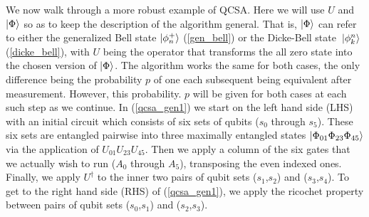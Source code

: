 \documentclass[10pt]{article}
\begin{document}
We now walk through a more robust example of QCSA. Here we will use $U$ and $\ket{\Phi}$ so as to keep the description of the algorithm general. That is, $\ket{\Phi}$ can refer to either the generalized Bell state $\ket{\phi^+_n}$ (\ref{gen_bell}) or the Dicke-Bell state $\ket*{\phi^n_k}$ (\ref{dicke_bell}), with $U$ being the operator that transforms the all zero state into the chosen version of $\ket{\Phi}$. The algorithm works the same for both cases, the only difference being the probability $p$ of one each subsequent being equivalent after measurement. However, this probability. $p$ will be given for both cases at each such step as we continue. In (\ref{qcsa_gen1}) we start on the left hand side (LHS) with an initial circuit which consists of six sets of qubits ($s_0$ through $s_5$). These six sets are entangled pairwise into three maximally entangled states $\ket{\Phi_{01}\Phi_{23}\Phi_{45}}$ via the application of $U_{01}U_{23}U_{45}$. Then we apply a column of the six gates that we actually wish to run ($A_0$ through $A_5$), transposing the even indexed ones. Finally, we apply $U^\dagger$ to the inner two pairs of qubit sets ($s_1$,$s_2$) and ($s_3$,$s_4$). To get to the right hand side (RHS) of (\ref{qcsa_gen1}), we apply the ricochet property between pairs of  qubit sets ($s_0$,$s_1$) and ($s_2$,$s_3$).
\end{document}
